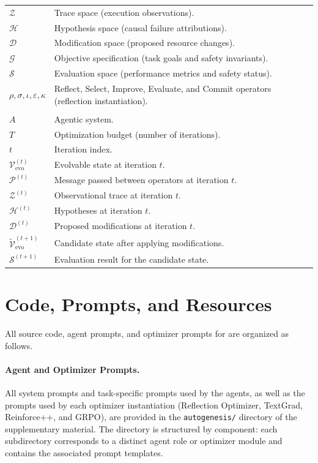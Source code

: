 \begin{table}[H]
\begin{tabular}{p{3.2cm}p{9.2cm}}
    $\mathcal{Z}$ & Trace space (execution observations). \\
    $\mathcal{H}$ & Hypothesis space (causal failure attributions). \\
    $\mathcal{D}$ & Modification space (proposed resource changes). \\
    $\mathcal{G}$ & Objective specification (task goals and safety invariants). \\
    $\mathcal{S}$ & Evaluation space (performance metrics and safety status). \\
    $\rho,\sigma,\iota,\varepsilon,\kappa$ & Reflect, Select, Improve, Evaluate, and Commit operators (reflection instantiation). \\
    \midrule
    \rowcolor{gray!15}
    \multicolumn{2}{c}{\textit{\textbf{Optimization Loop (Alg.~\ref{alg:sepl-loop-appx})}}} \\
    $A$ & Agentic system. \\
    $T$ & Optimization budget (number of iterations). \\
    $t$ & Iteration index. \\
    $\mathcal{V}_{\text{evo}}^{(t)}$ & Evolvable state at iteration $t$. \\
    $\mathcal{P}^{(t)}$ & Message passed between operators at iteration $t$. \\
    $\mathcal{Z}^{(t)}$ & Observational trace at iteration $t$. \\
    $\mathcal{H}^{(t)}$ & Hypotheses at iteration $t$. \\
    $\mathcal{D}^{(t)}$ & Proposed modifications at iteration $t$. \\
    $\widetilde{\mathcal{V}}_{\text{evo}}^{(t+1)}$ & Candidate state after applying modifications. \\
    $\mathcal{S}^{(t+1)}$ & Evaluation result for the candidate state. \\
    \bottomrule
  \end{tabular}
\end{table}


\section{Code, Prompts, and Resources}
\label{appx_sec:code-prompts-resources}

All source code, agent prompts, and optimizer prompts for \projectname are organized as follows.

\paragraph{Agent and Optimizer Prompts.}
All system prompts and task-specific prompts used by the agents, as well as the prompts used by each optimizer instantiation (Reflection Optimizer, TextGrad, Reinforce++, and GRPO), are provided in the \texttt{autogenesis/} directory of the supplementary material.
The directory is structured by component: each subdirectory corresponds to a distinct agent role or optimizer module and contains the associated prompt templates.

